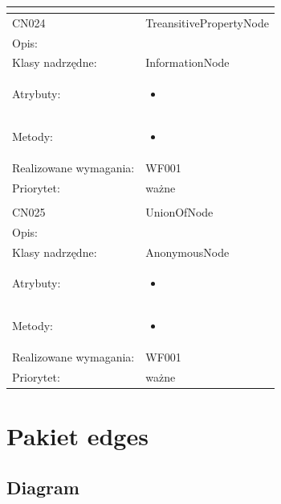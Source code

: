\documentclass[a4paper,10pt]{article}
\begin{document}
\begin{center}
\begin{longtable}{|m{3cm}|m{9cm}|}
\multicolumn{2}{c}{} \\
 \hline

CN024 & TreansitivePropertyNode \\ \hline
Opis: &     \\ \hline
Klasy nadrzędne: & InformationNode     \\ \hline
Atrybuty: & \begin{itemize}
 \item 
\end{itemize}
 \\ \hline
Metody: & \begin{itemize}
 \item 
\end{itemize}
  \\ \hline
Realizowane wymagania: & WF001 \\ \hline
Priorytet: & ważne  \\ \hline

\multicolumn{2}{c}{} \\
 \hline

CN025 & UnionOfNode \\ \hline
Opis: &     \\ \hline
Klasy nadrzędne: & AnonymousNode     \\ \hline
Atrybuty: & \begin{itemize}
 \item 
\end{itemize}
 \\ \hline
Metody: & \begin{itemize}
 \item 
\end{itemize}
  \\ \hline
Realizowane wymagania: & WF001 \\ \hline
Priorytet: & ważne  \\ \hline



\end{longtable}

\end{center}

\section{Pakiet edges}

\subsection{Diagram}
\end{document}
